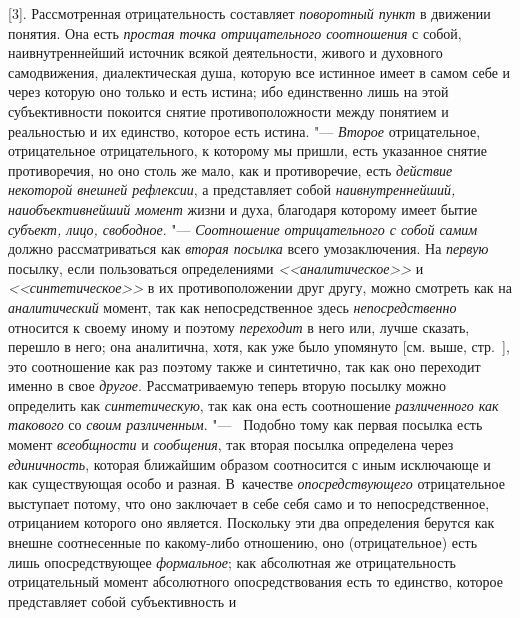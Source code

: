 [3]. Рассмотренная отрицательность составляет {\em поворотный пункт} в
движении понятия. Она есть {\em простая
точка отрицательного соотношения} с собой, наивнутреннейший
источник всякой деятельности, живого и духовного самодвижения,
диалектическая душа, которую все истинное имеет в самом себе и через
которую оно только и есть истина; ибо единственно лишь на этой
субъективности покоится снятие противоположности между понятием и
реальностью и их единство, которое есть истина. "--- {\em Второе}
отрицательное, отрицательное отрицательного, к которому мы
пришли, есть указанное снятие противоречия, но оно столь же мало, как и
противоречие, есть {\em действие
некоторой внешней рефлексии}, а представляет собой
{\em наивнутреннейший, наиобъективнейший
момент} жизни и духа, благодаря которому имеет бытие
{\em субъект, лицо, свободное}. "--- {\em Соотношение отрицательного с собой
самим} должно рассматриваться как {\em вторая посылка} всего умозаключения. На
{\em первую} посылку, если пользоваться определениями
{\em <<аналитическое>>} и {\em <<синтетическое>>} в
их противоположении друг другу, можно смотреть как на {\em аналитический}
момент, так как непосредственное здесь {\em непосредственно}
относится к своему иному и поэтому {\em переходит} в него
или, лучше сказать, перешло в него; она аналитична, хотя, как уже было
упомянуто [см. выше, стр.~\pageref{bkm:bmpg224a}], это
соотношение как раз поэтому также и синтетично, так как оно переходит
именно в свое {\em другое}. Рассматриваемую теперь вторую
посылку можно определить как {\em синтетическую}, так
как она есть соотношение {\em различенного как такового} со {\em своим
различенным}. "--- ~Подобно тому как первая посылка есть момент
{\em всеобщности} и {\em сообщения}, так
вторая посылка определена через {\em единичность},
которая ближайшим образом соотносится с иным исключающе и
как существующая особо и разная. В~качестве {\em опосредствующего}
отрицательное выступает потому, что оно заключает в себе себя
само и то непосредственное, отрицанием которого оно
является. Поскольку эти два определения берутся как внешне соотнесенные по
какому-либо отношению, оно (отрицательное) есть лишь опосредствующее
{\em формальное}; как
абсолютная же отрицательность отрицательный момент абсолютного
опосредствования есть то единство, которое представляет собой субъективность и
